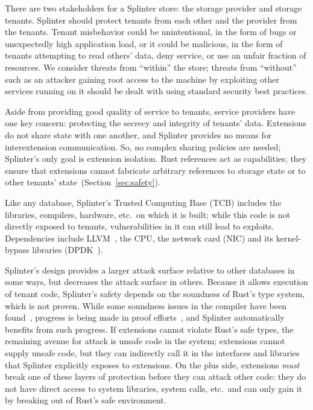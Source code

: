 There are two stakeholders for a Splinter store: the storage
provider and storage tenants. Splinter should protect tenants from each other
and the provider from the tenants. Tenant
misbehavior could be unintentional, in the form of bugs or unexpectedly high
application load, or it could be malicious, in the form of tenants attempting
to read others' data, deny service, or use an unfair fraction of resources.
We consider threats from ``within'' the store; threats from ``without'' such
as an attacker gaining root access to the machine by exploiting other services
running on it should be dealt with using standard security best practices.


Aside from providing good quality of service to tenants, service providers
  have one key concern: protecting the secrecy and integrity of tenants' data.
Extensions do not share state with one another, and Splinter provides no means for
interextension communication. So, no complex sharing policies are needed;
Splinter's only goal is extension isolation.
Rust references act as capabilities; they ensure that extensions cannot
fabricate arbitrary references
to storage state or to other tenants' state~(Section~\ref{sec:safety}).

Like any database, Splinter's Trusted Computing Base (TCB) includes the
    libraries, compilers, hardware, etc.\ on which it is built; while
    this code is not directly exposed to tenants, vulnerabilities in it can
    still lead to exploits.
Dependencies include LLVM~\cite{llvm}, the CPU, the 
    network card (NIC) and its kernel-bypass libraries (DPDK~\cite{dpdk}).

Splinter's design provides a larger attack surface relative to other
    databases in some ways, but decreases the attack surface in others.
Because it allows execution of tenant code, Splinter's safety depends on the
    soundness of Rust's type system, which is not proven.
While some soundness issues in the compiler have been
    found~\cite{rustc-unsound}, progress is being made in proof
    efforts~\cite{rustbelt-2018}, and Splinter automatically benefits from
    such progress.
If extensions cannot violate Rust's safe types, the remaining avenue for
    attack is unsafe code in the system; extensions cannot supply unsafe
    code, but they can indirectly call it in the 
    interfaces and libraries that Splinter explicitly exposes to extensions.
On the plus side, extensions \emph{must} break one of these layers of
    protection before they can attack other code: they do not have
    direct access to system libraries, system calls, etc.\ and can only gain it
    by breaking out of Rust's safe environment.

